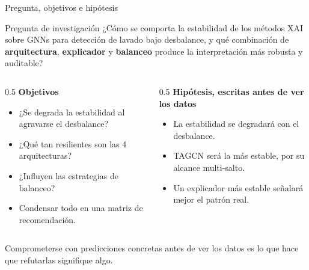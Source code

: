 \documentclass[aspectratio=169,11pt]{beamer}
\begin{document}
\begin{frame}{Pregunta, objetivos e hipótesis}
\begin{block}{Pregunta de investigación}
\footnotesize ¿Cómo se comporta la \alert{estabilidad} de los métodos XAI sobre GNNs para detección de lavado bajo desbalance, y qué combinación de \textbf{arquitectura}, \textbf{explicador} y \textbf{balanceo} produce la interpretación más robusta y auditable?
\end{block}
\vspace{0.1em}
\begin{columns}[T]
\begin{column}{0.5\textwidth}
{\scriptsize\color{navy}\textbf{Objetivos}}
\begin{itemize}\scriptsize
  \item[\textcolor{amber}{O1}] ¿Se degrada la estabilidad al agravarse el desbalance?
  \item[\textcolor{amber}{O2}] ¿Qué tan resilientes son las 4 arquitecturas?
  \item[\textcolor{amber}{O3}] ¿Influyen las estrategias de balanceo?
  \item[\textcolor{amber}{O4}] Condensar todo en una matriz de recomendación.
\end{itemize}
\end{column}
\begin{column}{0.5\textwidth}
{\scriptsize\color{navy}\textbf{Hipótesis, escritas antes de ver los datos}}
\begin{itemize}\scriptsize
  \item[\textcolor{coral}{H1}] La estabilidad se degradará con el desbalance.
  \item[\textcolor{coral}{H2}] TAGCN será la más estable, por su alcance multi-salto.
  \item[\textcolor{coral}{H3}] Un explicador más estable señalará mejor el patrón real.
\end{itemize}
\end{column}
\end{columns}
\vspace{0.3em}
{\scriptsize\color{muted} Comprometerse con predicciones concretas antes de ver los datos es lo que hace que refutarlas signifique algo.}
\end{frame}
\end{document}
